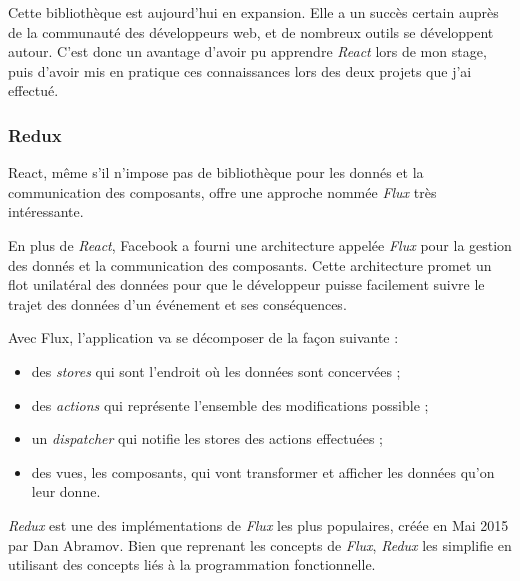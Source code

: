 \documentclass[12pt,a4paper]{article}
\providecommand{\tightlist}{%
  \setlength{\itemsep}{0pt}\setlength{\parskip}{0pt}}
\begin{document}
  \bigskip

  Cette bibliothèque est aujourd'hui en expansion. Elle a un succès
  certain auprès de la communauté des développeurs web, et de nombreux
  outils se développent autour. C'est donc un avantage d'avoir pu
  apprendre \emph{React} lors de mon stage, puis d'avoir mis en pratique
  ces connaissances lors des deux projets que j'ai effectué.

  \bigskip

  \subsubsection{Redux}\label{redux}

  \bigskip

  React, même s'il n'impose pas de bibliothèque pour les donnés et la
  communication des composants, offre une approche nommée \emph{Flux} très
  intéressante.

  \bigskip

  En plus de \emph{React}, Facebook a fourni une architecture appelée
  \emph{Flux} pour la gestion des donnés et la communication des
  composants. Cette architecture promet un flot unilatéral des données
  pour que le développeur puisse facilement suivre le trajet des données
  d'un événement et ses conséquences.

  \bigskip

  Avec Flux, l'application va se décomposer de la façon suivante :

  \begin{itemize}
  \tightlist
  \item
    des \emph{stores} qui sont l'endroit où les données sont concervées ;
  \item
    des \emph{actions} qui représente l'ensemble des modifications
    possible ;
  \item
    un \emph{dispatcher} qui notifie les stores des actions effectuées ;
  \item
    des vues, les composants, qui vont transformer et afficher les données
    qu'on leur donne.
  \end{itemize}

  \bigskip

  \emph{Redux} est une des implémentations de \emph{Flux} les plus
  populaires, créée en Mai 2015 par Dan Abramov. Bien que reprenant les
  concepts de \emph{Flux}, \emph{Redux} les simplifie en utilisant des
  concepts liés à la programmation fonctionnelle.

  \bigskip
\end{document}
